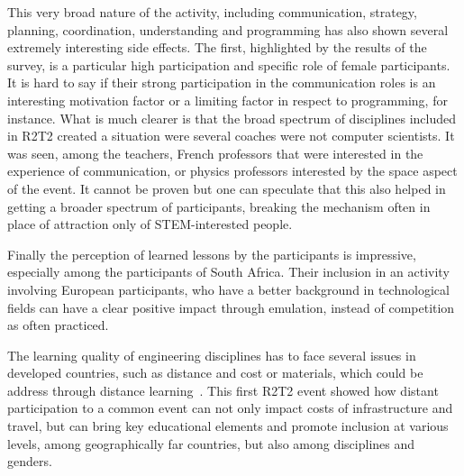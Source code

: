 \documentclass{intech-journal}
\begin{document}
This very broad nature of the activity, including communication, strategy, planning, coordination, understanding and programming has also shown several extremely interesting side effects.
The first, highlighted by the results of the survey, is a particular high participation and specific role of female participants.
It is hard to say if their strong participation in the communication roles is an interesting motivation factor or a limiting factor in respect to programming, for instance. 
What is much clearer is that the broad spectrum of disciplines included in R2T2 created a situation were several coaches were not computer scientists. 
It was seen, among the teachers, French professors that were interested in the experience of communication, or physics professors interested by the space aspect of the event. 
It cannot be proven but one can speculate that this also helped in getting a broader spectrum of participants, breaking the mechanism often in place of attraction only of STEM-interested people.

Finally the perception of learned lessons by the participants is impressive, especially among the participants of South Africa.
Their inclusion in an activity involving European participants, who have a better background in technological fields can have a clear positive impact through emulation, instead of competition as often practiced. 

The learning quality of engineering disciplines has to face several issues in developed countries, such as distance and cost or materials, which could be address through distance learning~\cite{winthrop2012new}. 
This first R2T2 event showed how distant participation to a common event can not only impact costs of infrastructure and travel, but can bring key educational elements and promote inclusion at various levels, among geographically far countries, but also among disciplines and genders.
\small
{}
\end{document}
